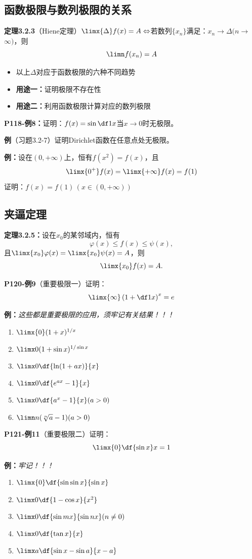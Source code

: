 \subsection{函数极限与数列极限的关系}

{\bf 定理3.2.3}（Hiene定理）$\limx{\Delta}f(x)=A\Leftrightarrow
$若数列$\{x_n\}$满足：$x_n\to \Delta(n\to$ $\infty)$，则
$$\limn f(x_n)=A$$

\begin{itemize}
  \setlength{\itemindent}{1cm}
  \item 以上$\Delta$对应于函数极限的六种不同趋势 
  \item {\bf 用途一：}证明极限不存在性
  \item {\bf 用途二：}利用函数极限计算对应的数列极限
\end{itemize}

{\bf P118-例8：}证明：$f(x)=\sin\df 1x$当$x\to 0$时无极限。

{\bf 例}（习题3.2-7）证明Dirichlet函数在任意点处无极限。

{\bf 例：}设在$(0,+\infty)$上，恒有$f(x^2)=f(x)$，且
$$\limx{0^+}f(x)=\limx{+\infty}f(x)=f(1)$$
证明：$f(x)=f(1)\,(x\in(0,+\infty))$

\subsection{夹逼定理}

{\bf 定理3.2.5：}设在$x_0$的某邻域内，恒有
$$\varphi(x)\leq f(x)\leq\psi(x), $$
且$\limx{x_0}\varphi(x)=\limx{x_0}\psi(x)=A$，则
$$\limx{x_0}f(x)=A.$$

{\bf P120-例9}（重要极限一）证明：
$$\limx{\infty}\left(1+\df 1x\right)^x=e$$

{\bf 例：}{\it 这些都是重要极限的应用，须牢记有关结果！！！}
\begin{enumerate}[(1)]
  \setlength{\itemindent}{1cm}
  \item $\limx{0}(1+x)^{1/x}$ 
  \item $\limx 0(1+\sin x)^{1/\sin x}$ 
  \item $\limx 0\df{\ln(1+ax)}{x}$
  \item $\limx 0\df{e^{ax}-1}{x}$ 
  \item $\limx 0\df{a^x-1}{x}(a>0)$ 
  \item $\limn n(\sqrt[n]{a}-1) (a>0)$ 
\end{enumerate}

{\bf P121-例11}（重要极限二）证明：
$$\limx{0}\df {\sin x}x=1$$

{\bf 例：}{\it 牢记！！！}
\begin{enumerate}[(1)]
  \setlength{\itemindent}{1cm}
  \item $\limx{0}\df{\sin\sin x}{\sin x}$ 
  \item $\limx 0\df{1-\cos x}{x^2}$ 
  \item $\limx 0\df{\sin mx}{\sin nx}(n\ne 0)$
  \item $\limx 0\df{\tan x}{x}$
  \item $\limx a\df{\sin x-\sin a}{x-a}$
\end{enumerate}

